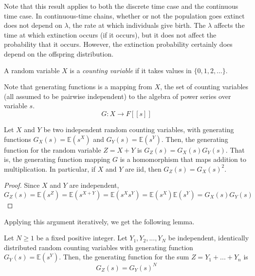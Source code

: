     Note that this result applies to both the discrete time case and the continuous time case. In continuous-time chains, whether or not the population goes extinct does not depend on $\lambda$, the rate at which individuals give birth. The $\lambda$ affects the time at which extinction occurs (if it occurs), but it does not affect the probability that it occurs. However, the extinction probability certainly does depend on the offspring distribution. 

    \begin{definition}
      A random variable $X$ is a \textit{counting variable} if it takes values in $\{0, 1, 2, ...\}$. 
    \end{definition}

    Note that generating functions is a mapping from $X$, the set of counting variables (all assumed to be pairwise independent) to the algebra of power series over variable $s$.
    \begin{equation}
      G: X \longrightarrow F[[s]]
    \end{equation}

    \begin{lemma}
      Let $X$ and $Y$ be two independent random counting variables, with generating functions $G_X (s) = \mathbb{E}(s^X)$ and $G_Y (s) = \mathbb{E}(s^Y)$. Then, the generating function for the random variable $Z = X + Y$ is $G_Z(s) = G_X (s) G_Y (s)$. That is, the generating function mapping $G$ is a homomorphism that maps addition to multiplication. In particular, if $X$ and $Y$ are iid, then $G_Z (s) = G_X (s)^2$. 
    \end{lemma}
    \begin{proof}
      Since $X$ and $Y$ are independent, 
      \begin{equation}
        G_Z (s) = \mathbb{E}(s^Z) = \mathbb{E}(s^{X+Y}) = \mathbb{E}(s^X s^Y) = \mathbb{E}(s^X) \mathbb{E}(s^Y) = G_X (s) G_Y (s)
      \end{equation}
    \end{proof}

    Applying this argument iteratively, we get the following lemma. 
    \begin{lemma}
      Let $N \geq 1$ be a fixed positive integer. Let $Y_1, Y_2, ..., Y_N$ be independent, identically distributed random counting variables with generating function $G_Y (s) = \mathbb{E}(s^Y)$. Then, the generating function for the sum $Z = Y_1 + ... + Y_n$ is 
      \begin{equation}
        G_Z (s) = G_Y (s)^N
      \end{equation}
    \end{lemma}

